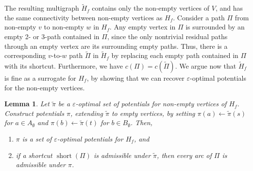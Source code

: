 \documentclass[11pt]{article}
\def\eps{\varepsilon}
\theoremstyle{plain}
\newtheorem{lemma}{Lemma}[section]
\numberwithin{figure}{section}
\def\short{\operatorname{short}}
\begin{document}
The resulting multigraph $\tilde{H}_f$ contains only the non-empty vertices of
$V$, and has the same connectivity between non-empty vertices as $H_f$.
Consider a path $\Pi$ from non-empty $v$ to non-empty $w$ in $H_f$.
Any empty vertex in $\Pi$ is surrounded by an empty 2- or 3-path contained
in $\Pi$, since the only nontrivial residual paths through an empty vertex are
its surrounding empty paths.
Thus, there is a corresponding $v$-to-$w$ path $\tilde{\Pi}$ in $\tilde{H}_f$
by replacing each empty path contained in $\Pi$ with its shortcut.
Furthermore, we have $c(\Pi) = c(\tilde{\Pi})$.
We argue now that $\tilde{H}_f$ is fine as a surrogate for $H_f$, by showing
that we can recover $\eps$-optimal potentials for the non-empty vertices.

\begin{lemma}
\label{lemma:empty_correct}
Let $\tilde{\pi}$ be a $\eps$-optimal set of potentials for non-empty
vertices of $H_f$.
Construct potentials $\pi$, extending $\tilde{\pi}$ to empty vertices, by
setting $\pi(a) \gets \tilde{\pi}(s)$ for $a \in A_\emptyset$ and
$\pi(b) \gets \tilde{\pi}(t)$ for $b \in B_\emptyset$.
Then,
\begin{enumerate}
\item $\pi$ is a set of $\eps$-optimal potentials for $H_f$, and
\item if a shortcut $\short(\Pi)$ is admissible under $\tilde{\pi}$,
	then every arc of $\Pi$ is admissible under $\pi$.
\end{enumerate}
\end{lemma}
\end{document}
